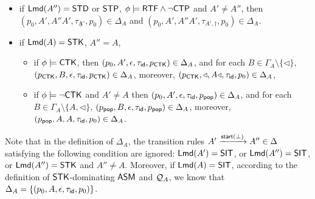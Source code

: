 {\begin{itemize}
\begin{itemize}
\begin{itemize}
\begin{itemize}
					\item $(p_0, A', \varepsilon, \tau_{A'}, p_{A'}) \in \Delta_{A}$, and for each $B \in \Gamma_A\setminus\{A'\}$, $(p_{A'}, B, \varepsilon, \tau_{\id}, p_{A'}) \in \Delta_{A}$, moreover, $(p_{A'}, A'', A'', \tau_{id}, p_0)  \in \Delta_{A}$, 
				\end{itemize}
				\item if ${\sf Lmd}(A'') = \mathsf{STD}$ or $\mathsf{STP}$, $\phi\models{\sf RTF}\wedge\neg{\sf CTP}$ and $A'\neq A''$,
                then $(p_0, A', A''A', \tau_{\not A'}, p_0) \in \Delta_{A}$ 
                and $(p_0, A', A''A', \tau_{A', \dag}, p_0) \in \Delta_{A}$.
                \item if ${\sf Lmd}(A) = \mathsf{STK}$, $A'' = A$, 
			\begin{itemize}
				\item if $\phi\models{\sf CTK}$, then $(p_0, A', \epsilon, \tau_{\mathsf{id}}, p_{{\sf CTK}}) \in \Delta_{A}$, and for each $B\in\Gamma_A\setminus\{\triangleleft\}$, $(p_{{\sf CTK}},B,\epsilon,\tau_{\mathsf{id}}, p_{{\sf CTK}})\in\Delta_{A}$, moreover, $(p_{{\sf CTK}},\triangleleft,A\triangleleft,\tau_{\mathsf{id}},p_0)\in\Delta_{A}$, 
				\item if $\phi\models\neg{\sf CTK}$ and $A'\neq A$ then 
                $(p_0, A',\epsilon,\tau_{\mathsf{id}},p_{\mathsf{pop}})\in\Delta_{A}$, and for each $B\in\Gamma_A\setminus\{A,\triangleleft\}$, $(p_{\mathsf{pop}},B,\epsilon,\tau_{\mathsf{id}},p_{\mathsf{pop}})\in\Delta_{A}$, moreover, $(p_{\mathsf{pop}},A,A,\tau_{\mathsf{id}},p_0)\in\Delta_{A}$.
			\end{itemize}
			\end{itemize}
        \end{itemize}
Note that in the definition of $\Delta_{A}$, the transition rules $A' \xrightarrow{{\mathsf{start} }(\bot)} A'' \in \Delta$ satisfying the following condition are ignored: ${\sf Lmd}(A') = {\sf SIT}$, or ${\sf Lmd}(A'') = {\sf SIT}$, or ${\sf Lmd}(A'') = {\sf STK}$ and $A'' \neq A$. 
Moreover, if ${\sf Lmd}(A) = {\sf SIT}$, according to the definition of $\mathsf{STK}$-dominating $\textsf{ASM}$ and ${\mathcal{Q} }_A$, we know that $\Delta_A = \{(p_0,A,\epsilon,\tau_{\mathsf{id}}, p_0)\}$.
\end{itemize}
}


